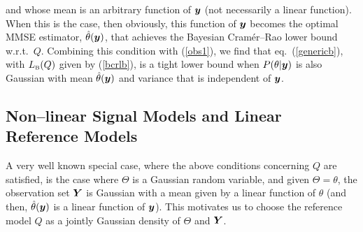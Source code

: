 \documentclass[11pt,epsf]{article}
\newcommand{\ct}{\hat{\theta}}
\newcommand {\by} {\mbox{\boldmath $y$}}
\newcommand {\bY} {\mbox{\boldmath $Y$}}
\begin{document}
and whose mean is an arbitrary function of $\by$ (not necessarily a linear
function). When
this is the case, then obviously, this
function of $\by$ becomes the optimal MMSE estimator, $\ct(\by)$, 
that achieves the Bayesian Cram\'er--Rao
lower bound w.r.t.\ $Q$.
Combining this condition with (\ref{obs1}), we find that
eq.\ (\ref{genericb}), with $L_{\mbox{\tiny B}}(Q)$ given by (\ref{bcrlb}),
is a tight lower bound when $P(\theta|\by)$ is also
Gaussian with mean $\ct(\by)$ and variance that is independent of $\by$.

\subsection{Non--linear Signal Models and Linear Reference Models}

A very well known special case, where the above conditions concerning $Q$ are satisfied, is the case
where $\Theta$ is a Gaussian random variable, and given $\Theta=\theta$, the
observation set $\bY$ is
Gaussian with a mean given by a linear function of $\theta$ (and then, $\ct(\by)$
is a linear function of $\by$). This motivates us to choose the reference model
$Q$ as a jointly Gaussian density of $\Theta$ and $\bY$. 
\end{document}
